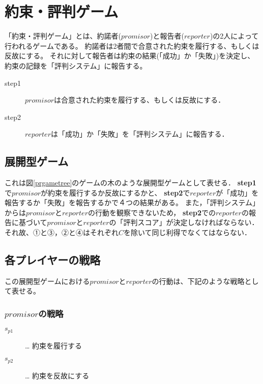 
\section{約束・評判ゲーム}
\label{promiseReputationGame}
「約束・評判ゲーム」とは、約諾者($promisor$)と報告者($reporter$)の2人によって行われるゲームである。
約諾者は2者間で合意された約束を履行する、もしくは反故にする。
それに対して報告者は約束の結果(「成功」か「失敗」)を決定し、約束の記録を「評判システム」に報告する。

\begin{description}
  \item[step1]  $promisor$は合意された約束を履行する、もしくは反故にする．
  \item[step2]  $reporter$は「成功」か「失敗」を「評判システム」に報告する．
\end{description}


\subsection{展開型ゲーム}
\label{prgame-by-extensive-form}

これは図\ref{prgametree}のゲームの木のような展開型ゲームとして表せる．
\textbf{step1}で$promisor$が約束を履行するか反故にするかと、
\textbf{step2}で$reporter$が「成功」を報告するか「失敗」を報告するかで４つの結果がある。
また，「評判システム」からは$promisor$と$reporter$の行動を観察できないため，
\textbf{step2}での$reporter$の報告に基づいて$promisor$と$reporter$の「評判スコア」が決定しなければならない．
それ故、①と③，②と④はそれぞれ$C$を除いて同じ利得でなくてはならない．



\subsection{各プレイヤーの戦略}
この展開型ゲームにおける$promisor$と$reporter$の行動は、下記のような戦略として表せる。

\subsubsection{$promisor$の戦略}
\begin{description}
  \item[$s_{p1}$]… 約束を履行する
  \item[$s_{p2}$]… 約束を反故にする
\end{description}

